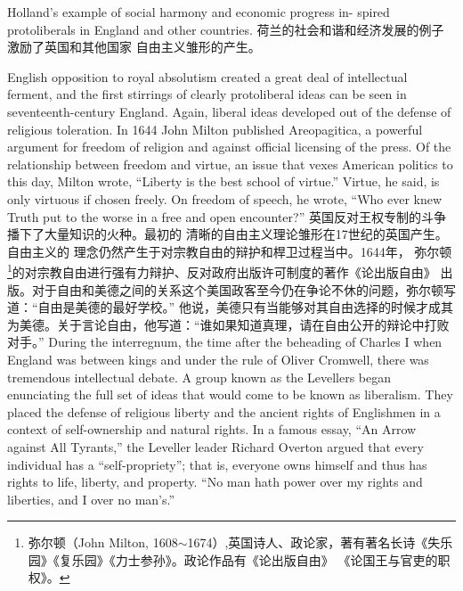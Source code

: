 \begin{paracol}{2}
\switchcolumn*
Holland's example of social harmony and economic progress in-
spired protoliberals in England and other countries.
\switchcolumn
荷兰的社会和谐和经济发展的例子激励了英国和其他国家
自由主义雏形的产生。


English opposition to royal absolutism created a great deal of
intellectual ferment, and the first stirrings of clearly protoliberal ideas can be seen in seventeenth-century England. Again, liberal ideas developed out of the defense of religious toleration.
In 1644 John Milton published Areopagitica, a powerful argument for freedom of religion and against official licensing of the
press. Of the relationship between freedom and virtue, an issue
that vexes American politics to this day, Milton wrote, ``Liberty
is the best school of virtue.'' Virtue, he said, is only virtuous if
chosen freely. On freedom of speech, he wrote, ``Who ever knew
Truth put to the worse in a free and open encounter?''
\switchcolumn
英国反对王权专制的斗争播下了大量知识的火种。最初的
清晰的自由主义理论雏形在17世纪的英国产生。 自由主义的
理念仍然产生于对宗教自由的辩护和桿卫过程当中。1644年，
弥尔顿\footnote{弥尔顿（John  Milton, 1608$\sim$1674）,英国诗人、政论家，著有著名长诗《失乐园》《复乐园》《力士参孙》。政论作品有《论出版自由》 《论国王与官吏的职权》。}的对宗教自由进行强有力辩护、反对政府出版许可制度的著作《论出版自由》 出版。对于自由和美德之间的关系这个美国政客至今仍在争论不休的问题，弥尔顿写道：“自由是美德的最好学校。” 他说，美德只有当能够对其自由选择的时候才成其为美德。关于言论自由，他写道：“谁如果知道真理，请在自由公开的辩论中打败对手。”
\switchcolumn*
During the interregnum, the time after the beheading of
Charles I when England was between kings and under the rule
of Oliver Cromwell, there was tremendous intellectual debate.
A group known as the Levellers began enunciating the full set
of ideas that would come to be known as liberalism. They
placed the defense of religious liberty and the ancient rights of
Englishmen in a context of self-ownership and natural rights. In
a famous essay, ``An Arrow against All Tyrants,'' the Leveller
leader Richard Overton argued that every individual has a ``self-propriety''; that is, everyone owns himself and thus has rights
to life, liberty, and property. ``No man hath power over my
rights and liberties, and I over no man's.''
\switchcolumn

\end{paracol}
